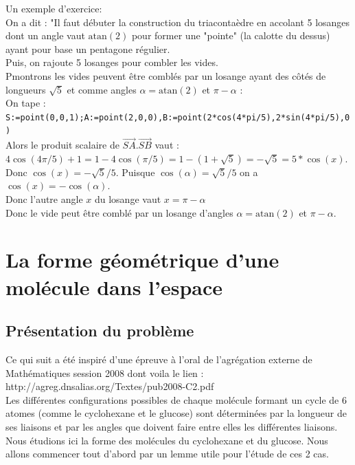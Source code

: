 \documentclass[a4paper,11pt]{book}
\newcommand{\atan}{\mbox{atan}}
\begin{document}
Un exemple d'exercice:\\
On a dit :
"Il faut d\'ebuter la construction du triaconta\`edre en accolant 5 losanges
dont un angle vaut $\atan(2)$ pour former une "pointe" (la calotte du dessus) 
ayant pour base un pentagone r\'egulier.\\ 
Puis, on rajoute 5 losanges pour combler les vides.\\
Pmontrons les vides peuvent \^etre combl\'es par un losange  ayant des
c\^ot\'es de longueurs $\sqrt 5$ et comme angles  $\alpha=\atan(2)$ et $\pi-\alpha$ :\\
On tape :\\
{\tt S:=point(0,0,1);A:=point(2,0,0),B:=point(2*cos(4*pi/5),2*sin(4*pi/5),0)}\\
Alors le produit scalaire de $\overrightarrow{SA}.\overrightarrow{SB}$ vaut :\\
$4\cos(4\pi/5)+1=1-4\cos(\pi/5)=1-(1+\sqrt 5)=-\sqrt 5=5*\cos(x)$.\\
Donc $\cos(x)=-\sqrt 5/5$. Puisque $\cos(\alpha)=\sqrt 5/5$ on a 
$\cos(x)=-\cos(\alpha)$.\\
Donc l'autre angle $x$ du losange vaut $x=\pi-\alpha$ \\
Donc le vide peut \^etre combl\'e par un losange d'angles 
$\alpha=\atan(2)$ et $\pi-\alpha$.
\section{La forme g\'eom\'etrique d'une mol\'ecule dans l'espace}
\subsection{Pr\'esentation du probl\`eme}
Ce qui suit a \'et\'e inspir\'e d'une \'epreuve \`a l'oral de l'agr\'egation
externe de Math\'ematiques session 2008 dont voila le lien :\\
 http://agreg.dnsalias.org/Textes/pub2008-C2.pdf\\
Les diff\'erentes configurations possibles de chaque mol\'ecule formant un 
cycle de 6 atomes (comme le cyclohexane et le glucose) sont d\'etermin\'ees par
la longueur de ses liaisons et par les angles que doivent faire entre elles les
diff\'erentes liaisons.\\
Nous \'etudions ici la forme des mol\'ecules du cyclohexane et du glucose.
Nous allons commencer tout d'abord par un lemme utile pour l'\'etude de ces 
2 cas.
\end{document}
